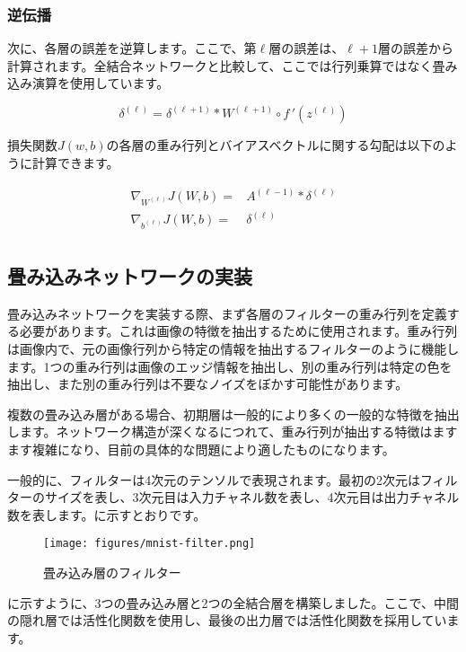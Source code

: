 \begin{content}
\begin{content}
\subsubsection{逆伝播}

次に、各層の誤差を逆算します。ここで、第$\ell$層の誤差は、$\ell + 1$層の誤差から計算されます。全結合ネットワークと比較して、ここでは行列乗算ではなく畳み込み演算を使用しています。

\[
{\delta ^{(\ell )}} = {\delta ^{(\ell  + 1)}} * {W^{(\ell  + 1)}} \circ f\,'\left( {{z^{(\ell )}}} \right)
\]

損失関数$J(w,b)$の各層の重み行列とバイアスベクトルに関する勾配は以下のように計算できます。

\[\begin{aligned}
  {\nabla _{{W^{(\ell )}}}}J(W,b) =  & {A^{(\ell  - 1)}} * {\delta ^{(\ell )}} \\ 
  {\nabla _{{b^{(\ell )}}}}J(W,b) =  & {\delta ^{(\ell )}} \\ 
\end{aligned} \]

\subsection{畳み込みネットワークの実装}

畳み込みネットワークを実装する際、まず各層のフィルターの重み行列を定義する必要があります。これは画像の特徴を抽出するために使用されます。重み行列は画像内で、元の画像行列から特定の情報を抽出するフィルターのように機能します。1つの重み行列は画像のエッジ情報を抽出し、別の重み行列は特定の色を抽出し、また別の重み行列は不要なノイズをぼかす可能性があります。

複数の畳み込み層がある場合、初期層は一般的により多くの一般的な特徴を抽出します。ネットワーク構造が深くなるにつれて、重み行列が抽出する特徴はますます複雑になり、目前の具体的な問題により適したものになります。

一般的に、フィルターは4次元のテンソルで表現されます。最初の2次元はフィルターのサイズを表し、3次元目は入力チャネル数を表し、4次元目は出力チャネル数を表します。に示すとおりです。

\begin{figure}[H]
\centering
\texttt{[image: figures/mnist-filter.png]}
\caption{畳み込み層のフィルター}
 \label{fig:mnist-filter}
\end{figure}

に示すように、3つの畳み込み層と2つの全結合層を構築しました。ここで、中間の隠れ層では活性化関数を使用し、最後の出力層では活性化関数を採用しています。


\end{content}
\end{content}
